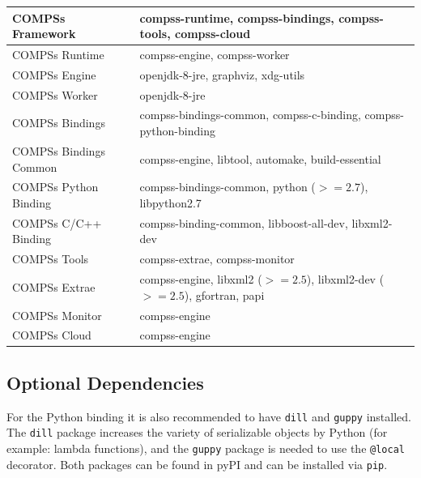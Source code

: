 \bgroup
  \def\arraystretch{1.5}
  \begin{center}
    \begin{tabular}{ p{6cm} | p{10cm} }
    COMPSs Framework 		& compss-runtime, compss-bindings, compss-tools, compss-cloud \\ \hline 
    COMPSs Runtime 		& compss-engine, compss-worker \\ \hline  
    COMPSs Engine 		& openjdk-8-jre, graphviz, xdg-utils \\ \hline 
    COMPSs Worker 		& openjdk-8-jre \\ \hline 
    COMPSs Bindings 		& compss-bindings-common, compss-c-binding, compss-python-binding \\ \hline 
    COMPSs Bindings Common 	& compss-engine, libtool, automake, build-essential \\ \hline 
    COMPSs Python Binding 	& compss-bindings-common, python ($>= 2.7$), libpython2.7 \\ \hline 
    COMPSs C/C++ Binding 	& compss-binding-common, libboost-all-dev, libxml2-dev \\ \hline 
    COMPSs Tools 		& compss-extrae, compss-monitor \\ \hline 
    COMPSs Extrae 		& compss-engine, libxml2 ($>= 2.5$), libxml2-dev ($>= 2.5$), gfortran, papi \\ \hline 
    COMPSs Monitor 		& compss-engine \\ \hline 
    COMPSs Cloud 		& compss-engine    
    \end{tabular}
  \end{center}
\egroup


\subsection{Optional Dependencies}

For the Python binding it is also recommended to have \verb|dill| and \verb|guppy| installed. The \verb|dill| package increases
the variety of serializable objects by Python (for example: lambda functions), and the \verb|guppy| package is needed to use the \verb|@local|
decorator. Both packages can be found in pyPI and can be installed via \verb|pip|.
